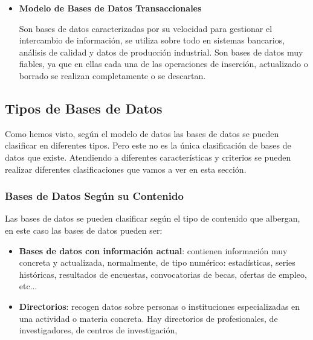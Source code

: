 \begin{itemize}
    \item \textbf{Modelo de Bases de Datos Transaccionales}

    Son bases de datos caracterizadas por su velocidad para gestionar el intercambio de información, se utiliza sobre todo en sistemas bancarios, análisis de calidad y datos de producción industrial. Son bases de datos muy fiables, ya que en ellas cada una de las operaciones de inserción, actualizado o borrado se realizan completamente o se descartan.
\end{itemize}

\subsection{Tipos de Bases de Datos}
Como hemos visto, según el modelo de datos las bases de datos se pueden clasificar en diferentes tipos. Pero este no es la única clasificación de bases de datos que existe. Atendiendo a diferentes características y criterios se pueden realizar diferentes clasificaciones que vamos a ver en esta sección.

\subsubsection{Bases de Datos Según su Contenido}
Las bases de datos se pueden clasificar según el tipo de contenido que albergan, en este caso las bases de datos pueden ser:

\begin{itemize}
    \item \textbf{Bases de datos con información actual}: contienen información muy concreta y actualizada, normalmente, de tipo numérico: estadísticas, series históricas, resultados de encuestas, convocatorias de becas, ofertas de empleo, etc...

    \item \textbf{Directorios}: recogen datos sobre personas o instituciones especializadas en una actividad o materia concreta. Hay directorios de profesionales, de investigadores, de centros de investigación,
\end{itemize}




\glsaddall
\printglossaries


\newpage
{}



